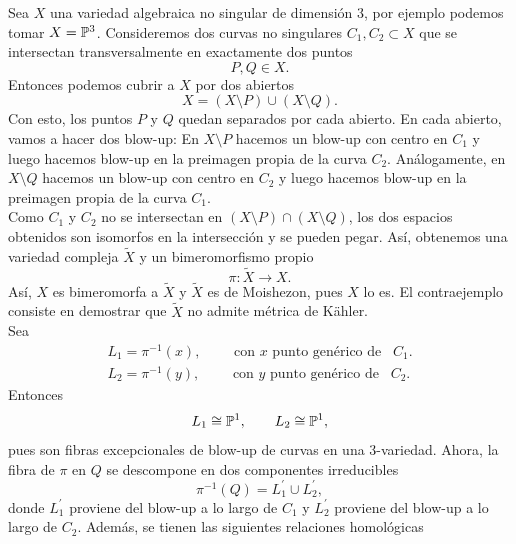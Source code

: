 \begin{example}\label{hironakaejemplo}\parencite{barlet2015exampleshhironaka}
	Sea $X$ una variedad algebraica no singular de dimensión $3$, por ejemplo podemos tomar $X=\mathbb{P}^3$. Consideremos dos curvas no singulares $C_1, C_2\subset X$ que se intersectan transversalmente en exactamente dos puntos
	\begin{equation*}
		P,Q\in X.
	\end{equation*} 
	Entonces podemos cubrir a $X$ por dos abiertos
	\begin{equation*}
		X=(X\setminus P)\cup(X\setminus Q).
	\end{equation*}
	Con esto, los puntos $P$ y $Q$ quedan separados por cada abierto. En cada abierto, vamos a hacer dos blow-up: En $X\setminus P$ hacemos un blow-up con centro en $C_1$ y luego hacemos blow-up en la preimagen propia de la curva $C_2$. Análogamente, en $X\setminus Q$ hacemos un blow-up con centro en $C_2$ y luego hacemos blow-up en la preimagen propia de la curva $C_1$.\\
	Como $C_1$ y $C_2$ no se intersectan en $(X\setminus P)\cap(X\setminus Q)$, los dos espacios obtenidos son isomorfos en la intersección y se pueden pegar. Así, obtenemos una variedad compleja $\tilde{X}$ y un bimeromorfismo propio
	\begin{equation*}
		\pi:\tilde{X}\longrightarrow X.
	\end{equation*} 
	Así, $X$ es bimeromorfa a $\tilde{X}$ y $\tilde{X}$ es de Moishezon, pues $X$ lo es. El contraejemplo consiste en demostrar que $\tilde{X}$ no admite métrica de Kähler.\\
	Sea 
	\begin{align*}
		L_1=\pi^{-1}(x),\qquad \text{ con }x\text{ punto genérico de }\enspace C_1.\\
		L_2=\pi^{-1}(y),\qquad \text{ con }y\text{ punto genérico de }\enspace C_2.
	\end{align*}
	Entonces
	\begin{equation*}
		L_1\cong \mathbb{P}^1,\qquad L_2\cong\mathbb{P}^1,
	\end{equation*}
	pues son fibras excepcionales de blow-up de curvas en una $3$-variedad. Ahora, la fibra de $\pi$ en $Q$ se descompone en dos componentes irreducibles
	\begin{equation*}
		\pi^{-1}(Q)=L_1^\prime\cup L_2^\prime,
	\end{equation*}
	donde $L_1^\prime$ proviene del blow-up a lo largo de $C_1$ y $L_2^\prime$ proviene del blow-up a lo largo de $C_2$. Además, se tienen las siguientes relaciones homológicas

\end{example}
